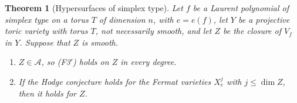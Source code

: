 \documentclass[11pt,reqno]{amsart}
\theoremstyle{plain}
\newtheorem{theorem}{Theorem}[section]
\theoremstyle{definition}
\theoremstyle{remark}
\begin{document}
\begin{theorem}[Hypersurfaces of simplex type]\label{thm:simplextype}
Let $f$ be a Laurent polynomial of simplex type on a torus $T$ of dimension
$n$, with $e=e(f)$, let $Y$ be a projective toric variety with torus $T$,
not necessarily smooth, and let $Z$ be the closure of $V_{f}$ in $Y$.
Suppose that $Z$ is smooth.
\begin{enumerate}[label=\textup{(\roman*)},leftmargin=2.6em,itemsep=2pt]
\item $Z\in\mathcal{A}$, so \textup{(F3$'$)} holds on $Z$ in every degree.
\item If the Hodge conjecture holds for the Fermat varieties $X^{j}_{e}$
  with $j\le\dim Z$, then it holds for $Z$.
\end{enumerate}
\end{theorem}
\end{document}
